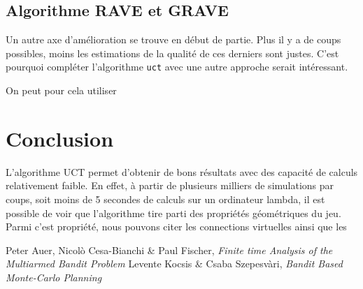 \documentclass[a4paper]{article}
\theoremstyle{definition}
\begin{document}
\subsection{Algorithme RAVE et GRAVE}

Un autre axe d'amélioration se trouve en début de partie. Plus il y a de coups possibles, moins les estimations de la qualité de ces derniers sont justes. C'est pourquoi compléter l'algorithme \texttt{uct} avec une autre approche serait intéressant.

On peut pour cela utiliser

\section{Conclusion}

L'algorithme UCT permet d'obtenir de bons résultats avec des capacité de calculs relativement faible. En effet, à partir de plusieurs milliers de simulations par coups, soit moins de 5 secondes de calculs sur un ordinateur lambda, il est possible de voir que l'algorithme tire parti des propriétés géométriques du jeu. Parmi c'est propriété, nous pouvons citer les connections virtuelles ainsi que les 

\newpage

\listoffigures 

\newpage

%
\begin{thebibliography}{9}
	
	Peter Auer, Nicol\`o Cesa-Bianchi \& Paul Fischer, {\em Finite time Analysis of the Multiarmed Bandit Problem}
	Levente Kocsis \& Csaba Szepesv\`ari, {\em Bandit Based Monte-Carlo Planning}
	
\end{thebibliography}
\end{document}
